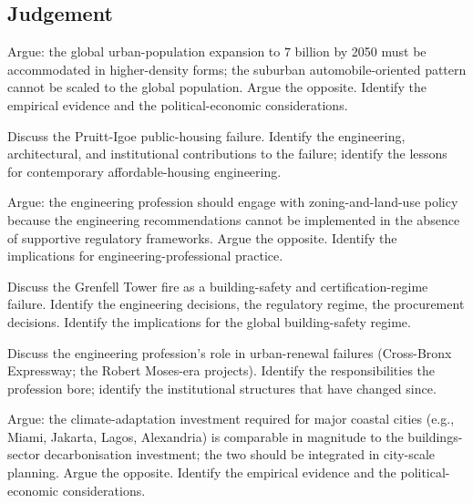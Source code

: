 \subsection*{Judgement}

\begin{exercise}
Argue: the global urban-population expansion to $7$ billion by 2050 must be accommodated in higher-density forms; the suburban automobile-oriented pattern cannot be scaled to the global population. Argue the opposite. Identify the empirical evidence and the political-economic considerations.
\end{exercise}

\begin{exercise}
Discuss the Pruitt-Igoe public-housing failure. Identify the engineering, architectural, and institutional contributions to the failure; identify the lessons for contemporary affordable-housing engineering.
\end{exercise}

\begin{exercise}
Argue: the engineering profession should engage with zoning-and-land-use policy because the engineering recommendations cannot be implemented in the absence of supportive regulatory frameworks. Argue the opposite. Identify the implications for engineering-professional practice.
\end{exercise}

\begin{exercise}
Discuss the Grenfell Tower fire as a building-safety and certification-regime failure. Identify the engineering decisions, the regulatory regime, the procurement decisions. Identify the implications for the global building-safety regime.
\end{exercise}

\begin{exercise}
Discuss the engineering profession's role in urban-renewal failures (Cross-Bronx Expressway; the Robert Moses-era projects). Identify the responsibilities the profession bore; identify the institutional structures that have changed since.
\end{exercise}

\begin{exercise}
Argue: the climate-adaptation investment required for major coastal cities (e.g., Miami, Jakarta, Lagos, Alexandria) is comparable in magnitude to the buildings-sector decarbonisation investment; the two should be integrated in city-scale planning. Argue the opposite. Identify the empirical evidence and the political-economic considerations.
\end{exercise}
